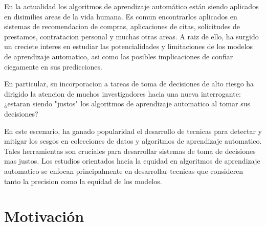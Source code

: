 
En la actualidad los algoritmos de aprendizaje automático están siendo aplicados en disimilies areas de la vida humana. Es comun encontrarlos aplicados en sistemas de recomendacion de compras, aplicaciones de citas, solicitudes de prestamos, contratacion personal y muchas otras areas.  A raiz de ello, ha surgido un creciete interes en estudiar las potencialidades y limitaciones de los modelos de aprendizaje automatico, asi como las posibles implicaciones de confiar ciegamente en sus predicciones.

En particular, su incorporacion a tareas de toma de decisiones de alto riesgo ha dirigido la atencion de muchos investigadores hacia una nueva interrogante: ¿estaran siendo "justos" los algoritmos de aprendizaje automatico al tomar sus decisiones?

En este escenario, ha ganado popularidad el desarrollo de tecnicas para detectar y mitigar los sesgos en colecciones de datos y algoritmos de aprendizaje automatico. Tales herramientas son cruciales para desarrollar sistemas de toma de decisiones mas justos. Los estudios orientados hacia la equidad en algoritmos de aprendizaje automatico se enfocan principalmente en desarrollar tecnicas que consideren tanto la precision como la equidad de los modelos.

\section*{Motivación}

